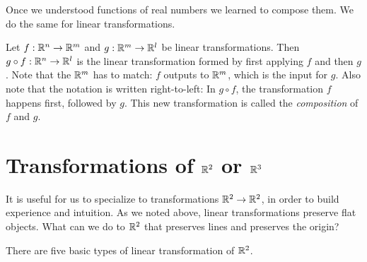 \documentclass[fleqn,letterpaper]{report}
\begin{document}
Once we understood functions of real numbers we learned to
compose them. We do the same for linear transformations.

\begin{defn}
Let $f : \mathbb{R}^n \rightarrow \mathbb{R}^m$ and $g: \mathbb{R}^m \rightarrow
\mathbb{R}^l$ be linear transformations. Then $g \circ f : \mathbb{R}^n
\rightarrow \mathbb{R}^l$ is the linear transformation formed by first
applying $f$ and then $g$. Note that the $\mathbb{R}^m$ has to match:
$f$ outputs to $\mathbb{R}^m$, which is the input for $g$. Also note
that the notation is written right-to-left: In $g \circ f$, the
transformation $f$ happens first, followed by $g$. This new
transformation is called the \emph{composition} of $f$ and $g$.
\end{defn}

\section{Transformations of $\mathbb{R}^2$ or $\mathbb{R}^3$}
\label{transformations-r2-r3}

It is useful for us to specialize to transformations $\mathbb{R}^2
\rightarrow \mathbb{R}^2$, in order to build experience and intuition.
As we noted above, linear transformations preserve flat
objects. What can we do to $\mathbb{R}^2$ that preserves lines and
preserves the origin? 

\begin{prop}
There are five basic types of linear transformation of $\mathbb{R}^2$.
\end{prop}
\end{document}
